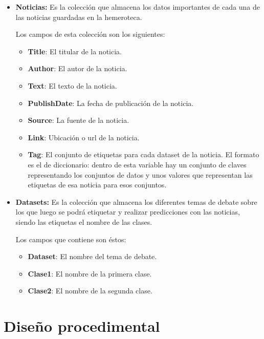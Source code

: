 \begin{itemize}

\item \textbf{Noticias:} Es la colección que almacena los datos importantes de cada una de las noticias guardadas en la hemeroteca.

Los campos de esta colección son los siguientes:

\begin{itemize}

\item \textbf{Title}: El titular de la noticia.
\item \textbf{Author}: El autor de la noticia.
\item \textbf{Text}: El texto de la noticia.
\item \textbf{PublishDate}: La fecha de publicación de la noticia.
\item \textbf{Source}: La fuente de la noticia.
\item \textbf{Link}: Ubicación o url de la noticia.
\item \textbf{Tag}: El conjunto de etiquetas para cada dataset de la noticia. El formato es el de diccionario: dentro de esta variable hay un conjunto de claves representando los conjuntos de datos y unos valores que representan las etiquetas de esa noticia para esos conjuntos.

\end{itemize}

\item \textbf{Datasets:} Es la colección que almacena los diferentes temas de debate sobre los que luego se podrá etiquetar y realizar predicciones con las noticias, siendo las etiquetas el nombre de las clases. 

Los campos que contiene son éstos:

\begin{itemize}

\item \textbf{Dataset}: El nombre del tema de debate.
\item \textbf{Clase1}: El nombre de la primera clase.
\item \textbf{Clase2}: El nombre de la segunda clase.

\end{itemize}

\end{itemize}

\section{Diseño procedimental}

